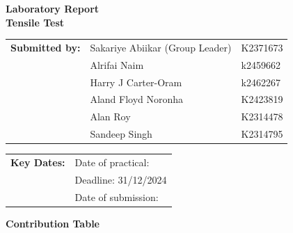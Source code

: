 \documentclass{article}
\begin{document}
        

    \vspace*{\fill}
    \begin{center}
        \textbf{\Huge Laboratory Report}\\[10pt]
        \LARGE \textbf{Tensile Test}
    \end{center}
    \vspace*{\fill}

    \Large    
    \begin{tabular}{@{}l l l@{}}
        \textbf{Submitted by:} & Sakariye Abiikar (Group Leader)\phantom{ssssss} & K2371673 \\
        & Alrifai Naim & k2459662 \\
        & Harry J Carter-Oram &  k2462267 \\
        & Aland Floyd Noronha & K2423819 \\
        & Alan Roy & K2314478 \\
        & Sandeep Singh & K2314795 \\   
    \end{tabular}
    
    \vspace*{\fill}
    
    \begin{tabular}{@{}l l@{}}
        \textbf{Key Dates:} & Date of practical: \\
        & Deadline: 31/12/2024 \\
        & Date of submission: \\
    \end{tabular}
    \vspace*{\fill}
    
    \large
    \newpage\noindent\vspace{2em}
    \begin{center}
        \LARGE \textbf{Contribution Table}\\[3em]
    \end{center}
    
\end{document}

